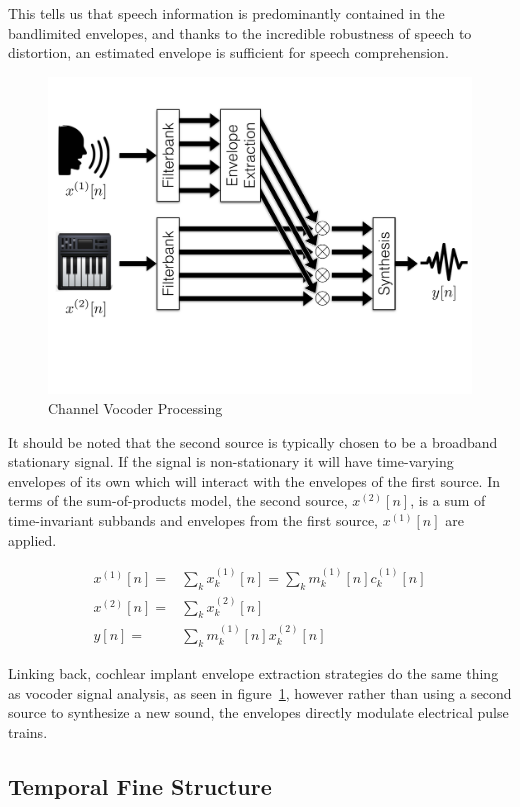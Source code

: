 \documentclass [11pt, proquest,oneside] {ganter_thesis}[2015/03/03]
\begin{document}
This tells us that speech information is predominantly contained in the bandlimited envelopes, and thanks to the incredible robustness of speech to distortion, an estimated envelope is sufficient for speech comprehension.

\begin{figure}[!ht]
  \centering
    \includegraphics[width=.75\textwidth]{vocoder}   
    \caption{Channel Vocoder Processing}\label{fig:vocoder}
\end{figure}

It should be noted that the second source is typically chosen to be a broadband stationary signal.  If the signal is non-stationary it will have time-varying envelopes of its own which will interact with the envelopes of the first source. In terms of the sum-of-products model, the second source, $x^{(2)}[n]$, is a sum of time-invariant subbands and envelopes from the first source, $x^{(1)}[n]$ are applied.

\begin{align}
\label{eq:sum-of-products}
x^{(1)}[n] =& \sum\limits_k x_k^{(1)}[n] = \sum\limits_k m^{(1)}_k[n] c^{(1)}_k[n] \\
x^{(2)}[n] =& \sum\limits_k x_k^{(2)}[n] \\
y[n] =& \sum\limits_k m_k^{(1)}[n] x_k^{(2)}[n]
\end{align}

Linking back, cochlear implant envelope extraction strategies do the same thing as vocoder signal analysis, as seen in figure~\ref{fig:vocoder}, however rather than using a second source to synthesize a new sound, the envelopes directly modulate electrical pulse trains.

\subsection{Temporal Fine Structure}
\end{document}
